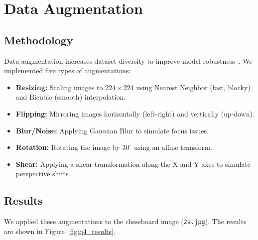 \documentclass[12pt]{article}
\begin{document}
\newpage
\section{Data Augmentation}

\subsection{Methodology}
Data augmentation increases dataset diversity to improve model robustness~\cite{shorten2019survey}. We implemented five types of augmentations:
\begin{itemize}
    \item \textbf{Resizing:} Scaling images to $224 \times 224$ using Nearest Neighbor (fast, blocky) and Bicubic (smooth) interpolation.
    \item \textbf{Flipping:} Mirroring images horizontally (left-right) and vertically (up-down).
    \item \textbf{Blur/Noise:} Applying Gaussian Blur to simulate focus issues.
    \item \textbf{Rotation:} Rotating the image by $30^\circ$ using an affine transform.
    \item \textbf{Shear:} Applying a shear transformation along the X and Y axes to simulate perspective shifts~\cite{simard2003best}.
\end{itemize}

\subsection{Results}
We applied these augmentations to the chessboard image (\texttt{2a.jpg}). The results are shown in Figure~\ref{fig:q4_results}.
\end{document}
